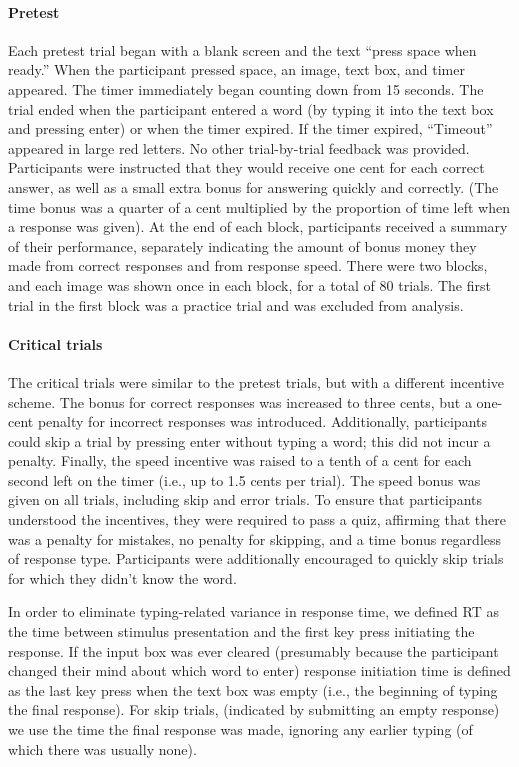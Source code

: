 \paragraph{Pretest} Each pretest trial began with a blank screen and the text ``press space when ready.'' When the participant pressed space, an image, text box, and timer appeared. The timer immediately began counting down from 15 seconds. The trial ended when the participant entered a word (by typing it into the text box and pressing enter) or when the timer expired. If the timer expired, ``Timeout'' appeared in large red letters. No other trial-by-trial feedback was provided. Participants were instructed that they would receive one cent for each correct answer, as well as a small extra bonus for answering quickly and correctly. (The time bonus was a quarter of a cent multiplied by the proportion of time left when a response was given). At the end of each block, participants received a summary of their performance, separately indicating the amount of bonus money they made from correct responses and from response speed. There were two blocks, and each image was shown once in each block, for a total of 80 trials. The first trial in the first block was a practice trial and was excluded from analysis.


\paragraph{Critical trials} The critical trials were similar to the pretest trials, but with a different incentive scheme. The bonus for correct responses was increased to three cents, but a one-cent penalty for incorrect responses was introduced. Additionally, participants could skip a trial by pressing enter without typing a word; this did not incur a penalty. Finally, the speed incentive was raised to a tenth of a cent for each second left on the timer (i.e., up to 1.5 cents per trial). The speed bonus was given on all trials, including skip and error trials. To ensure that participants understood the incentives, they were required to pass a quiz, affirming that there was a penalty for mistakes, no penalty for skipping, and a time bonus regardless of response type. Participants were additionally encouraged to quickly skip trials for which they didn't know the word.

In order to eliminate typing-related variance in response time, we defined RT as the time between stimulus presentation and the first key press initiating the response. If the input box was ever cleared (presumably because the participant changed their mind about which word to enter) response initiation time is defined as the last key press when the text box was empty (i.e., the beginning of typing the final response). For skip trials, (indicated by submitting an empty response) we use the time the final response was made, ignoring any earlier typing (of which there was usually none).

